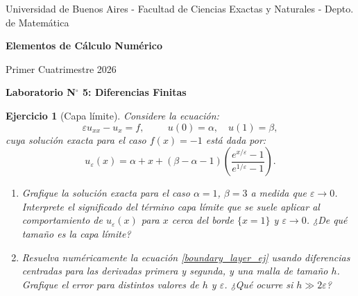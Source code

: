 \documentclass[12pt]{article}
\newtheorem{exercise}{Ejercicio}
\begin{document}
\centerline{{\small Universidad de Buenos Aires - Facultad de Ciencias Exactas y Naturales - Depto. de Matemática}}
 
 \vskip 0.2cm
 \hrulefill
 \vskip 0.2cm

 \centerline{{\bf\Huge {\sc Elementos de Cálculo Numérico}}}
 \vskip 0.2cm
 \centerline{\ttfamily Primer Cuatrimestre 2026}
 \hrulefill

 \bigskip
 \centerline{\bf Laboratorio N$^\circ$ 5: Diferencias Finitas}
 \bigskip

\begin{exercise}[Capa límite]\label{ejer_boundary_layer}
Considere la ecuación:
\begin{equation}
\label{boundary_layer_ej}
\varepsilon u_{xx} - u_{x} = f, \hspace{1cm} u(0)=\alpha, \quad u(1)=\beta,
\end{equation}
cuya solución exacta para el caso $f(x) = -1$ está dada por:
\[
u_{\varepsilon}(x) = \alpha + x + (\beta - \alpha -1) \left( \frac{e^{x/\varepsilon}-1 }{e^{1/\varepsilon}-1} \right).
\]
\begin{enumerate}
\item Grafique la solución exacta para el caso $\alpha=1$, $\beta=3$ a medida que $\varepsilon \to 0$. Interprete el significado del término \textit{capa límite} que se suele aplicar al comportamiento de $u_\varepsilon(x)$ para $x$ cerca del borde $\{ x=1 \}$ y $\varepsilon \to 0$. ¿De qué tamaño es la \textit{capa límite}?
\item Resuelva numéricamente la ecuación \eqref{boundary_layer_ej} usando diferencias centradas para las derivadas primera y segunda, y una malla de tamaño $h$. Grafique el error para distintos valores de $h$ y $\varepsilon$. ¿Qué ocurre si $h \gg 2\varepsilon$?
\end{enumerate}
\end{exercise}
\end{document}
